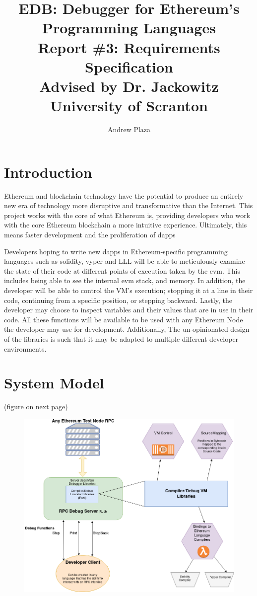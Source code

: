 \documentclass{report}
\title{%
	EDB: Debugger for Ethereum's Programming Languages \\
	\medskip
	\large Report \#3: Requirements Specification \\
	\large Advised by Dr. Jackowitz	\\
	\large University of Scranton}
\author{Andrew Plaza}
\begin{document}
\maketitle
\tableofcontents
\newpage

\section{Introduction}
Ethereum and \Gls{blockchain} technology have the potential to produce an entirely new era of technology more disruptive and transformative than the Internet. This project works with the core of what Ethereum is, providing developers who work with the core Ethereum \gls{blockchain} a more intuitive experience. Ultimately, this means faster development and the proliferation of \glspl{dapp}

Developers hoping to write new \glspl{dapp} in Ethereum-specific programming languages such as \gls{solidity}, \gls{vyper} and \gls{LLL} will be able to meticulously examine the state of their code at different points of execution taken by the \gls{evm}. This includes being able to see the internal \gls{evm} stack, and memory. In addition, the developer will be able to control the VM's execution; stopping it at a line in their code, continuing from a specific position, or stepping backward. Lastly, the developer may choose to inspect variables and their values that are in use in their code. All these functions will be available to be used with any Ethereum Node the developer may use for development. Additionally, The un-opinionated design of the libraries is such that it may be adapted to multiple different developer environments.

\section{System Model}
(figure on next page)
\begin{landscape}
	\begin{figure}
	\includegraphics[height=\textheight]{SystemModel.png}
	\end{figure}
\end{landscape}
\newpage
\end{document}
